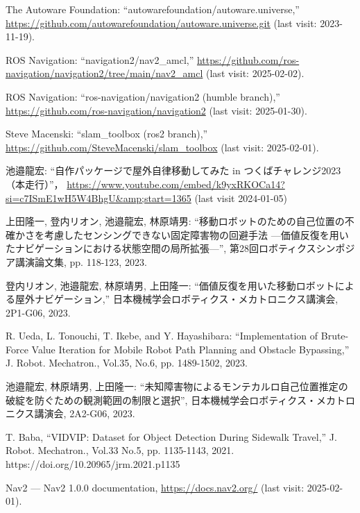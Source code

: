 \documentclass[twocolumn,9pt]{jsproceedings}
\begin{document}
\begin{thebibliography}{99}
  The Autoware Foundation: ``autowarefoundation/autoware.universe,'' \url{https://github.com/autowarefoundation/autoware.universe.git} (last visit: 2023-11-19).
  
  ROS Navigation: ``navigation2/nav2\_amcl,'' \url{https://github.com/ros-navigation/navigation2/tree/main/nav2_amcl}  (last visit: 2025-02-02).

  ROS Navigation: ``ros-navigation/navigation2 (humble branch),'' \url{https://github.com/ros-navigation/navigation2} (last visit: 2025-01-30).

  Steve Macenski: ``slam\_toolbox (ros2 branch),'' \url{https://github.com/SteveMacenski/slam_toolbox} (last visit: 2025-02-01).

  池邉龍宏: ``自作パッケージで屋外自律移動してみた in つくばチャレンジ2023（本走行）''，
  \url{https://www.youtube.com/embed/k9yxRKOCa14?si=c7ISmE1wH5W4BhgU&amp;start=1365} (last visit 2024-01-05)

上田隆一, 登内リオン, 池邉龍宏, 林原靖男: ``移動ロボットのための自己位置の不確かさを考慮したセンシングできない固定障害物の回避手法 ---価値反復を用いたナビゲーションにおける状態空間の局所拡張---'', 第28回ロボティクスシンポジア講演論文集, pp. 118-123, 2023.

  登内リオン, 池邉龍宏, 林原靖男, 上田隆一: ``価値反復を用いた移動ロボットによる屋外ナビゲーション,''
  日本機械学会ロボティクス・メカトロニクス講演会, 2P1-G06, 2023.

  R. Ueda, L. Tonouchi, T. Ikebe, and Y. Hayashibara: ``Implementation of Brute-Force Value Iteration for Mobile Robot Path Planning and Obstacle Bypassing,''
  J. Robot. Mechatron., Vol.35, No.6, pp. 1489-1502, 2023.

  池邉龍宏, 林原靖男, 上田隆一: ``未知障害物によるモンテカルロ自己位置推定の破綻を防ぐための観測範囲の制限と選択'',
  日本機械学会ロボティクス・メカトロニクス講演会, 2A2-G06, 2023.
  
  T. Baba, “VIDVIP: Dataset for Object Detection During Sidewalk Travel,” J. Robot. Mechatron., Vol.33 No.5, pp. 1135-1143, 2021. https://doi.org/10.20965/jrm.2021.p1135
  
  Nav2 — Nav2 1.0.0 documentation, \url{https://docs.nav2.org/} (last visit: 2025-02-01).
\end{thebibliography}
\normalsize
\end{document}
